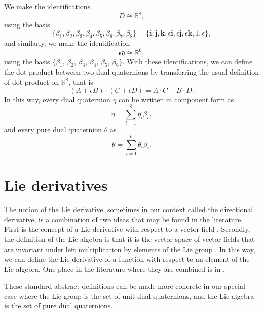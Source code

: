 \documentclass[reqno,12pt]{amsart}
\newcommand\bi{\bm i}
\newcommand\bj{\bm j}
\newcommand\bk{\bm k}
\newcommand\setdualquat{D}
\newcommand\setpuredualquat{\mathfrak{sd}}
\begin{document}
We make the identifications
\begin{equation}
\setdualquat \cong \mathbb R^8,
\end{equation}
using the basis
\begin{equation}
\{\beta_1, \beta_2, \beta_3, \beta_4, \beta_5, \beta_6, \beta_7, \beta_8\} = \{\bi, \bj, \bk, \epsilon\bi, \epsilon\bj, \epsilon\bk, 1, \epsilon\},
\end{equation}
and similarly, we make the identification
\begin{equation}
\setpuredualquat \cong \mathbb R^6,
\end{equation}
using the basis $\{\beta_1$, $\beta_2$, $\beta_3$, $\beta_4$, $\beta_5$, $\beta_6\}$.  With these identifications, we can define the dot product between two dual quaternions by transferring the usual definition of dot product on $\mathbb R^8$, that is
\begin{equation}
(A + \epsilon B) \cdot (C + \epsilon D) = A \cdot C + B \cdot D.
\end{equation}
In this way, every dual quaternion $\eta$ can be written in component form as
\begin{equation}
\eta = \sum_{i=1}^8 \eta_i \beta_i ,
\end{equation}
and every pure dual quaternion $\theta$ as
\begin{equation}
\theta = \sum_{i=1}^6 \theta_i \beta_i .
\end{equation}

\section{Lie derivatives}

The notion of the Lie derivative, sometimes in our context called the directional derivative, is a combination of two ideas that may be found in the literature.  First is the concept of a Lie derivative with respect to a vector field \cite{wiki1,yano}.  Secondly, the definition of the Lie algebra is that it is the vector space of vector fields that are invariant under left multiplication by elements of the Lie group \cite{lee,wiki2}.  In this way, we can define the Lie derivative of a function with respect to an element of the Lie algebra.  One place in the literature where they are combined is in \cite[equation~(5), Chapter~II]{helgason}.

These standard abstract definitions can be made more concrete in our special case where the Lie group is the set of unit dual quaternions, and the Lie algebra is the set of pure dual quaternions.
\end{document}
